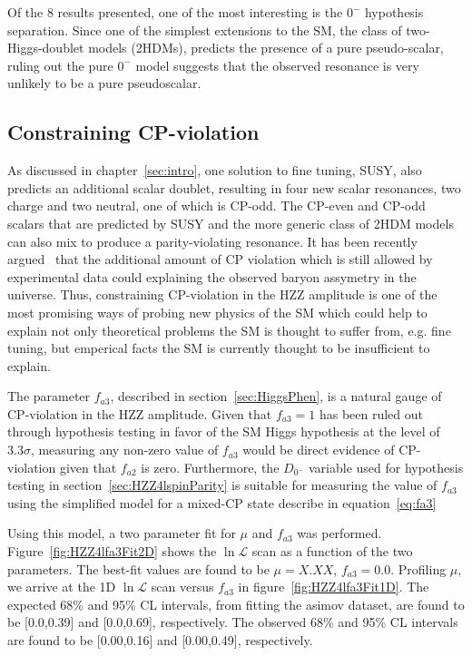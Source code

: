 Of the 8 results presented, one of the most interesting is the 
$0^-$ hypothesis separation.  Since one of the simplest extensions
to the SM, the class of two-Higgs-doublet models (2HDMs), 
predicts the presence of a pure pseudo-scalar, ruling out the 
pure $0^-$ model suggests that the observed resonance is very 
unlikely to be a pure pseudoscalar. 

\subsection{Constraining CP-violation}
\label{sec:HZZ4lcpViolation}

As discussed in chapter~\ref{sec:intro}, one solution to 
fine tuning, SUSY, also predicts an additional scalar doublet, 
resulting in four new 
scalar resonances, two charge and two neutral, one of which 
is CP-odd.  
The CP-even and CP-odd
scalars that are predicted by SUSY and the more generic class
of 2HDM models can also mix to produce a parity-violating 
resonance.  
It has been recently argued~\cite{Shu:2013uua} that
the additional amount of CP violation which is still allowed by
experimental data could explaining the observed baryon assymetry
in the universe.  Thus, constraining CP-violation in the HZZ 
amplitude is one of the most promising ways of probing
new physics of the SM which could help to explain not only 
theoretical problems the SM is thought to suffer from, e.g. 
fine tuning, but emperical facts the SM is currently thought to
be insufficient to explain.  

The parameter $f_{a3}$, described in section~\ref{sec:HiggsPhen},
is a natural gauge of CP-violation in the HZZ amplitude.  Given 
that $f_{a3}=1$
has been ruled out through hypothesis testing in favor of the
SM Higgs hypothesis at the level of $3.3\sigma$,  measuring any
non-zero value of $f_{a3}$ would be direct evidence of CP-violation
given that $f_{a2}$ is zero.  Furthermore, the $D_{0^-}$ variable 
used for hypothesis testing in section~\ref{sec:HZZ4lspinParity} 
is suitable for measuring the value of $f_{a3}$ using the 
simplified model for a mixed-CP state describe in 
equation~\ref{eq:fa3}

Using this model, a two parameter fit for $\mu$ and $f_{a3}$ was 
performed.  
Figure~\ref{fig:HZZ4lfa3Fit2D} shows the $\ln\mathscr{L}$ scan as a 
function of the two parameters.  The best-fit values are 
found to be $\mu=X.XX$, $f_{a3}=0.0$.  Profiling $\mu$, we 
arrive at the 1D $\ln\mathscr{L}$ scan versus $f_{a3}$ in 
figure~\ref{fig:HZZ4lfa3Fit1D}.  The expected 68\% and 95\% CL 
intervals, from fitting the asimov dataset, are found to be 
[0.0,0.39] and [0.0,0.69], respectively. 
The observed  68\% and 95\% CL 
intervals are found to be [0.00,0.16] and [0.00,0.49], 
respectively. 

